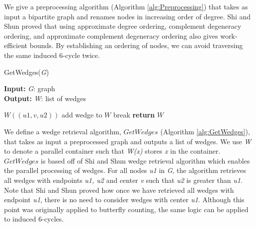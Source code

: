 \documentclass[11pt]{article}
\begin{document}
We give a preprocessing algorithm (Algorithm \ref{alg:Preprocessing}) that takes as input a bipartite graph and renames nodes in increasing order of degree.
Shi and Shun \cite{shi2019parallel} proved that using approximate degree ordering, complement degeneracy ordering, and approximate complement degeneracy ordering also gives work-efficient bounds.
By establishing an ordering of nodes, we can avoid traversing the same induced 6-cycle twice.

\begin{algorithm}[H]
\caption{GetWedges(\textit{G})}
\label{alg:GetWedges}
\hspace*{\algorithmicindent} \textbf{Input:} \textit{G}: graph \\
\hspace*{\algorithmicindent} \textbf{Output:} \textit{W}: list of wedges
\begin{algorithmic}[1]
                    \State $W((u1, v, u2))$ \Comment add wedge to $W$
                \Else
                    \State break
                \EndIf
            \EndFor
        \EndFor
    \EndFor
    \State \textbf{return} $W$
\end{algorithmic}
\end{algorithm}

We define a wedge retrieval algorithm, $GetWedges$ (Algorithm \ref{alg:GetWedges}), that takes as input a preprocessed graph and outputs a list of wedges.
We use \textit{W} to denote a parallel container such that \textit{W(x)} stores \textit{x} in the container.
$GetWedges$ is based off of Shi and Shun \cite{shi2019parallel} wedge retrieval algorithm which enables the parallel processing of wedges.
For all nodes \textit{u1} in \textit{G}, the algorithm retrieves all wedges with endpoints \textit{u1, u2} and center \textit{v} such that \textit{u2} is greater than \textit{u1}.
Note that Shi and Shun proved how once we have retrieved all wedges with endpoint \textit{u1}, there is no need to consider wedges with center \textit{u1}.
Although this point was originally applied to butterfly counting, the same logic can be applied to induced 6-cycles.
\end{document}
